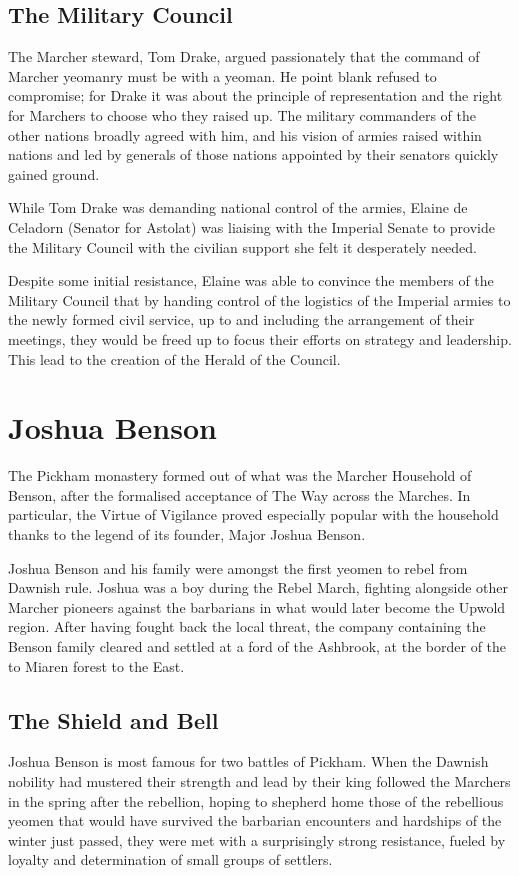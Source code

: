 \documentclass[twoside,11pt,b5paper,twocolumn]{scrbook}
\begin{document}
\subsection{The Military Council}
The Marcher steward, Tom Drake, argued passionately that the command of Marcher yeomanry must be with a yeoman. He point blank refused to compromise; for Drake it was about the principle of representation and the right for Marchers to choose who they raised up. The military commanders of the other nations broadly agreed with him, and his vision of armies raised within nations and led by generals of those nations appointed by their senators quickly gained ground.

While Tom Drake was demanding national control of the armies, Elaine de Celadorn (Senator for Astolat) was liaising with the Imperial Senate to provide the Military Council with the civilian support she felt it desperately needed.

Despite some initial resistance, Elaine was able to convince the members of the Military Council that by handing control of the logistics of the Imperial armies to the newly formed civil service, up to and including the arrangement of their meetings, they would be freed up to focus their efforts on strategy and leadership. This lead to the creation of the Herald of the Council.
\section{Joshua Benson}
The Pickham monastery
formed out of what was
the Marcher Household of
Benson, after the formalised
acceptance of The Way across the
Marches. In particular, the Virtue of
Vigilance proved especially popular
with the household thanks to the
legend of its founder, Major Joshua
Benson.

Joshua Benson and his
family were amongst the first
yeomen to rebel from Dawnish rule.
Joshua was a boy during the Rebel
March, fighting alongside other
Marcher pioneers against the
barbarians in what would later
become the Upwold region. After
having fought back the local threat,
the company containing the Benson
family cleared and settled at a ford of
the Ashbrook, at the border of the to
Miaren forest to the East.
\subsection{The Shield and Bell}
Joshua Benson is most famous
for two battles of Pickham.
When the Dawnish nobility
had mustered their strength and lead
by their king followed the Marchers
in the spring after the rebellion,
hoping to shepherd home those of
the rebellious yeomen that would
have survived the barbarian
encounters and hardships of the
winter just passed, they were met
with a surprisingly strong
resistance, fueled by loyalty and
determination of small groups of
settlers.
\end{document}
